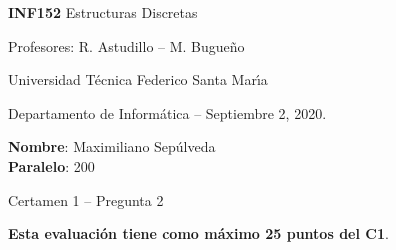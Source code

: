 \documentclass[legalpaper,10pt]{article}
\begin{document}
\thispagestyle{empty}

\begin{minipage}[t]{0.6\textwidth}

{\LARGE \textbf{INF152} Estructuras Discretas}

{\large Profesores: R. Astudillo -- M. Bugueño}

Universidad Técnica Federico Santa Mar\'{\i}a

Departamento de Informática -- Septiembre 2, 2020.

\end{minipage}
\hfill
\begin{minipage}[t]{0.35\textwidth}
\textbf{Nombre}: Maximiliano Sepúlveda\\[0.3cm]
  \textbf{Paralelo}: 200
\end{minipage}

\vspace{0.8cm}

{\Large Certamen 1 -- Pregunta 2}

\vspace{0.4cm}

\textbf{Esta evaluación tiene como máximo 25 puntos del C1}.
\end{document}
